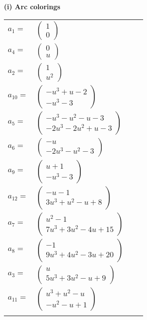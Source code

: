 \documentclass[1p]{elsarticle_modified}
\theoremstyle{definition}
\begin{document}
\flushleft \textbf{(i) Arc colorings}\\
\begin{tabular}{m{7pt} m{180pt} m{7pt} m{180pt} }
\flushright $a_{1}=$&$\begin{pmatrix}1\\0\end{pmatrix}$ \\
\flushright $a_{4}=$&$\begin{pmatrix}0\\u\end{pmatrix}$ \\
\flushright $a_{2}=$&$\begin{pmatrix}1\\u^2\end{pmatrix}$ \\
\flushright $a_{10}=$&$\begin{pmatrix}- u^3+u-2\\- u^3-3\end{pmatrix}$ \\
\flushright $a_{5}=$&$\begin{pmatrix}- u^3- u^2- u-3\\-2 u^3-2 u^2+u-3\end{pmatrix}$ \\
\flushright $a_{6}=$&$\begin{pmatrix}- u\\-2 u^3- u^2-3\end{pmatrix}$ \\
\flushright $a_{9}=$&$\begin{pmatrix}u+1\\- u^3-3\end{pmatrix}$ \\
\flushright $a_{12}=$&$\begin{pmatrix}- u-1\\3 u^3+u^2- u+8\end{pmatrix}$ \\
\flushright $a_{7}=$&$\begin{pmatrix}u^2-1\\7 u^3+3 u^2-4 u+15\end{pmatrix}$ \\
\flushright $a_{8}=$&$\begin{pmatrix}-1\\9 u^3+4 u^2-3 u+20\end{pmatrix}$ \\
\flushright $a_{3}=$&$\begin{pmatrix}u\\5 u^3+3 u^2- u+9\end{pmatrix}$ \\
\flushright $a_{11}=$&$\begin{pmatrix}u^3+u^2- u\\- u^2- u+1\end{pmatrix}$\\&\end{tabular}
\end{document}
